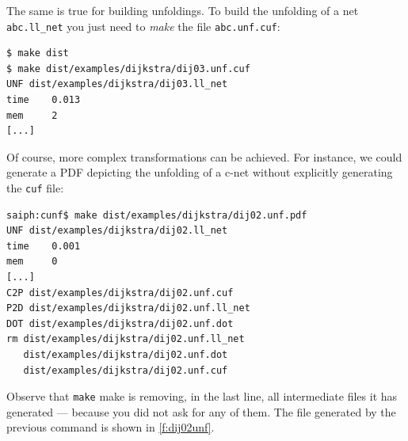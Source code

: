 \documentclass[a4paper]{refart}
\begin{document}
The same is true for building unfoldings.  To build the unfolding of a net
\verb!abc.ll_net! you just need to \textit{make} the file
\verb!abc.unf.cuf!:
\begin{verbatim}
$ make dist
$ make dist/examples/dijkstra/dij03.unf.cuf
UNF dist/examples/dijkstra/dij03.ll_net
time    0.013
mem     2
[...]
\end{verbatim}
Of course, more complex transformations can be achieved.  For instance, we
could generate a PDF depicting the unfolding of a c-net without
explicitly generating the \verb!cuf! file:
\begin{verbatim}
saiph:cunf$ make dist/examples/dijkstra/dij02.unf.pdf
UNF dist/examples/dijkstra/dij02.ll_net
time    0.001
mem     0
[...]
C2P dist/examples/dijkstra/dij02.unf.cuf
P2D dist/examples/dijkstra/dij02.unf.ll_net
DOT dist/examples/dijkstra/dij02.unf.dot
rm dist/examples/dijkstra/dij02.unf.ll_net
   dist/examples/dijkstra/dij02.unf.dot
   dist/examples/dijkstra/dij02.unf.cuf
\end{verbatim}
Observe that \verb!make! make is removing, in the last line, all
intermediate files it has generated --- because you did not ask for any of
them.  The file generated by the previous command is shown in
\cref{f:dij02unf}.
\end{document}
